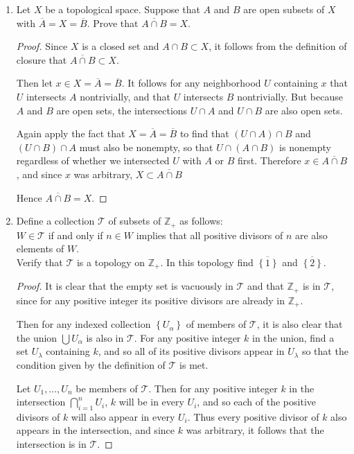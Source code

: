 \documentclass[11pt]{article}
\newcommand{\cbr}[1]{\left\{#1\right\}}
\begin{document}
\begin{enumerate}
\begin{proof}
      Therefore $X$ is a Hausdorff space if and only if $D$ is a closed subset of $X\times X$.
    \end{proof}
    \item Let $X$ be a topological space. Suppose that $A$ and $B$ are open subsets of $X$ with $\overline{A} = X = \overline{B}$. Prove that $\overline{A\cap B} = X$.
    \begin{proof}
      Since $X$ is a closed set and $A\cap B\subset X$, it follows from the definition of closure that $\overline{A\cap B} \subset X$.

      Then let $x\in X = \overline{A}= \overline{B}$. It follows for any neighborhood $U$ containing $x$ that $U$ intersects $A$ nontrivially, and that $U$ intersects $B$ nontrivially. But because $A$ and $B$ are open sets, the intersections $U\cap A$ and $U\cap B$ are also open sets.

      Again apply the fact that $X = \overline{A} = \overline{B}$ to find that $(U\cap A)\cap B$ and $(U\cap B)\cap A$ must also be nonempty, so that $U\cap(A\cap B)$ is nonempty regardless of whether we intersected $U$ with $A$ or $B$ first. Therefore $x\in \overline{A\cap B}$, and since $x$ was arbitrary, $X\subset \overline{A\cap B}$

      Hence $\overline{A\cap B} = X$.
    \end{proof}
    \item Define a collection $\mathcal{T}$ of subsets of $\mathbb{Z}_+$ as follows: \\
    $W\in \mathcal{T}$ if and only if $n\in W$ implies that all positive divisors of $n$ are also elements of $W$.\\
    Verify that $\mathcal{T}$ is a topology on $\mathbb{Z}_+$. In this topology find $\overline{\cbr{1}}$ and $\overline{\cbr{2}}$.
    \begin{proof}
      It is clear that the empty set is vacuously in $\mathcal{T}$ and that $\mathbb{Z}_+$ is in $\mathcal{T}$, since for any positive integer its positive divisors are already in $\mathbb{Z}_+$.

      Then for any indexed collection $\cbr{U_\alpha}$ of members of $\mathcal{T}$, it is also clear that the union $\bigcup U_\alpha$ is also in $\mathcal{T}$. For any positive integer $k$ in the union, find a set $U_\lambda$ containing $k$, and so all of its positive divisors appear in $U_\lambda$ so that the condition given by the definition of $\mathcal{T}$ is met.

      Let $U_1, \dots, U_n$ be members of $\mathcal{T}$. Then for any positive integer $k$ in the intersection $\bigcap_{i=1}^n U_i$, $k$ will be in every $U_i$, and so each of the positive divisors of $k$ will also appear in every $U_i$. Thus every positive divisor of $k$ also appears in the intersection, and since $k$ was arbitrary, it follows that the intersection is in $\mathcal{T}$.


\end{proof}
\end{enumerate}
\end{document}
